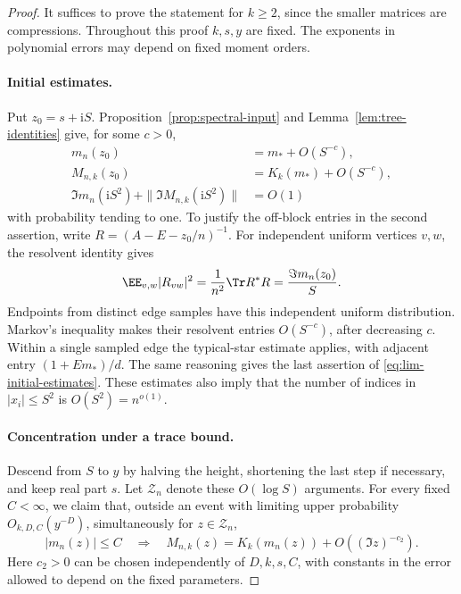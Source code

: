 \begin{proof}
It suffices to prove the statement for \(k\ge2\), since the smaller
matrices are compressions. Throughout this proof \(k,s,y\) are fixed.
The exponents in polynomial errors may depend on fixed moment orders.

\paragraph{Initial estimates.}
Put \(z_0=s+\mathrm i S\). Proposition~\ref{prop:spectral-input} and
Lemma~\ref{lem:tree-identities} give, for some \(c>0\),
\begin{equation}\label{eq:lim-initial-estimates}
 \begin{split}
  m_n(z_0)&=m_*+O(S^{-c}),\\
  M_{n,k}(z_0)&=K_k(m_*)+O(S^{-c}),\\
  \Im m_n(\mathrm i S^2)+\|\Im M_{n,k}(\mathrm i S^2)\|&=O(1)
 \end{split}
\end{equation}
with probability tending to one. To justify the off-block entries in the
second assertion, write \(R=(A-E-z_0/n)^{-1}\). For independent uniform
vertices \(v,w\), the resolvent identity gives
\[
 \EE_{v,w}|R_{vw}|^2
 =\frac1{n^2}\Tr R^*R
 =\frac{\Im m_n(z_0)}{S}.
\]
Endpoints from distinct edge samples have this independent uniform
distribution. Markov's inequality makes their resolvent entries
\(O(S^{-c})\), after decreasing \(c\). Within a single sampled edge the
typical-star estimate applies, with adjacent entry
\((1+E m_*)/d\). The same reasoning gives the last assertion of
\eqref{eq:lim-initial-estimates}. These estimates also imply that the
number of indices in \(|x_i|\le S^2\) is \(O(S^2)=n^{o(1)}\).

\paragraph{Concentration under a trace bound.}
Descend from \(S\) to \(y\) by halving the height, shortening the last
step if necessary, and keep real part \(s\). Let \(\mathcal Z_n\) denote
these \(O(\log S)\) arguments. For every fixed \(C<\infty\), we claim
that, outside an event with limiting upper probability
\(O_{k,D,C}(y^{-D})\), simultaneously for \(z\in\mathcal Z_n\),
\begin{equation}\label{eq:lim-concentration-implication}
 |m_n(z)|\le C
 \quad\Longrightarrow\quad
 M_{n,k}(z)=K_k(m_n(z))+O((\Im z)^{-c_2}).
\end{equation}
Here \(c_2>0\) can be chosen independently of \(D,k,s,C\), with constants
in the error allowed to depend on the fixed parameters.


\end{proof}
